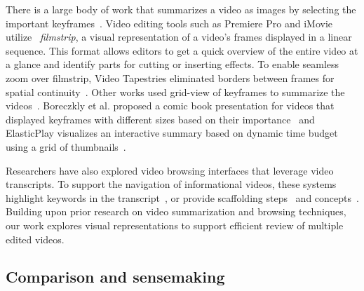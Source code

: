 There is a large body of work that summarizes a video as images by selecting the important keyframes~\cite{truong2016quickcut, chang2021rubyslippers, barnes2010video, boreczky2000interactive, jin2017elasticplay}. 
Video editing tools such as Premiere Pro and iMovie utilize ~\textit{filmstrip}, a visual representation of a video's frames displayed in a linear sequence. This format allows editors to get a quick overview of the entire video at a glance and identify parts for cutting or inserting effects. To enable seamless zoom over filmstrip, Video Tapestries eliminated borders between frames for spatial continuity~\cite{barnes2010video}. 
Other works used grid-view of keyframes to summarize the videos~\cite{boreczky2000interactive, jin2017elasticplay}. Boreczkly et al. proposed a comic book presentation for videos that displayed keyframes with different sizes based on their importance~\cite{boreczky2000interactive} and ElasticPlay visualizes an interactive summary based on dynamic time budget using a grid of thumbnails~\cite{jin2017elasticplay}.

Researchers have also explored video browsing interfaces that leverage video transcripts. To support the navigation of informational videos, these systems highlight keywords in the transcript~\cite{chang2021rubyslippers}, or provide scaffolding steps~\cite{yang2022softvideo, fraser2020temporal} and concepts~\cite{liu2018conceptscape}.
Building upon prior research on video summarization and browsing techniques, our work explores visual representations to support efficient review of multiple edited videos. 



\subsection{Comparison and sensemaking}

